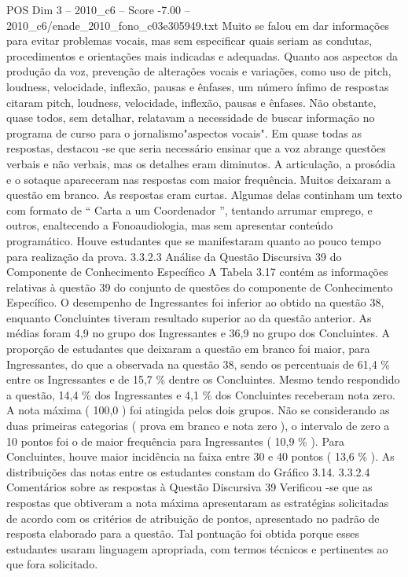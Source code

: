 \begin{textsample}{POS Dim 3 – 2010\_c6 – Score -7.00 – 2010\_c6/enade\_2010\_fono\_c03e305949.txt}
Muito se falou em dar informações para evitar problemas vocais, mas sem especificar quais seriam as condutas, procedimentos e orientações mais indicadas e adequadas.
Quanto aos aspectos da produção da voz, prevenção de alterações vocais e variações, como uso de pitch, loudness, velocidade, inflexão, pausas e ênfases, um número ínfimo de respostas citaram pitch, loudness, velocidade, inflexão, pausas e ênfases.
Não obstante, quase todos, sem detalhar, relatavam a necessidade de buscar informação no programa de curso para o jornalismo"aspectos vocais".
Em quase todas as respostas, destacou -se que seria necessário ensinar que a voz abrange questões verbais e não verbais, mas os detalhes eram diminutos.
A articulação, a prosódia e o sotaque apareceram nas respostas com maior frequência.
Muitos deixaram a questão em branco.
As respostas eram curtas.
Algumas delas continham um texto com formato de “ Carta a um Coordenador ”, tentando arrumar emprego, e outros, enaltecendo a Fonoaudiologia, mas sem apresentar conteúdo programático.
Houve estudantes que se manifestaram quanto ao pouco tempo para realização da prova. 3.3.2.3 Análise da Questão Discursiva 39 do Componente de Conhecimento Específico A Tabela 3.17 contém as informações relativas à questão 39 do conjunto de questões do componente de Conhecimento Específico.
O desempenho de Ingressantes foi inferior ao obtido na questão 38, enquanto Concluintes tiveram resultado superior ao da questão anterior.
As médias foram 4,9 no grupo dos Ingressantes e 36,9 no grupo dos Concluintes.
A proporção de estudantes que deixaram a questão em branco foi maior, para Ingressantes, do que a observada na questão 38, sendo os percentuais de 61,4 \% entre os Ingressantes e de 15,7 \% dentre os Concluintes.
Mesmo tendo respondido a questão, 14,4 \% dos Ingressantes e 4,1 \% dos Concluintes receberam nota zero.
A nota máxima ( 100,0 ) foi atingida pelos dois grupos.
Não se considerando as duas primeiras categorias ( prova em branco e nota zero ), o intervalo de zero a 10 pontos foi o de maior frequência para Ingressantes ( 10,9 \% ).
Para Concluintes, houve maior incidência na faixa entre 30 e 40 pontos ( 13,6 \% ).
As distribuições das notas entre os estudantes constam do Gráfico 3.14. 3.3.2.4 Comentários sobre as respostas à Questão Discursiva 39 Verificou -se que as respostas que obtiveram a nota máxima apresentaram as estratégias solicitadas de acordo com os critérios de atribuição de pontos, apresentado no padrão de resposta elaborado para a questão.
Tal pontuação foi obtida porque esses estudantes usaram linguagem apropriada, com termos técnicos e pertinentes ao que fora solicitado.

\end{textsample}
